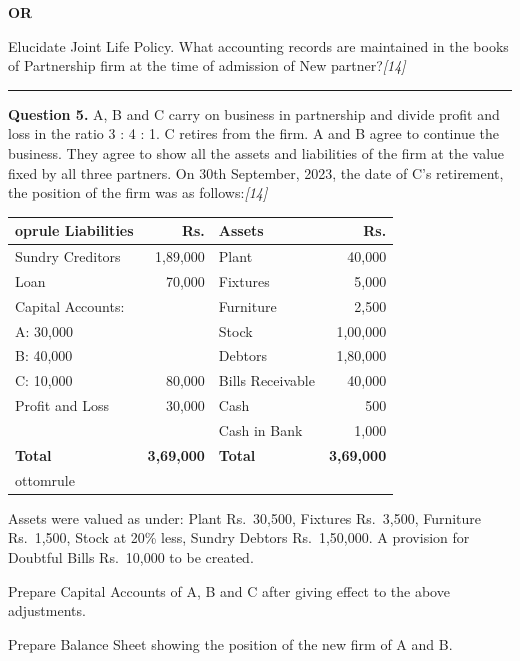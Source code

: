 \documentclass[11pt,a4paper]{article}
\newcommand{\pts}[1]{\hfill   \textit{[#1]}}
\begin{document}
\centerline{   \textbf{OR}}

Elucidate Joint Life Policy. What accounting records are maintained in the books of Partnership firm at the time of admission of New partner?\pts{14}

\medskip\rule{\linewidth}{0.2pt}




\noindent   \textbf{Question 5.}
A, B and C carry on business in partnership and divide profit and loss in the ratio 3 : 4 : 1. C retires from the firm. A and B agree to continue the business. They agree to show all the assets and liabilities of the firm at the value fixed by all three partners. On 30th September, 2023, the date of C's retirement, the position of the firm was as follows:\pts{14}


\begin{center}\small
  
\begin{tabular}{lr|lr}
     oprule
   \textbf{Liabilities} &   \textbf{Rs.} &   \textbf{Assets} &   \textbf{Rs.} \\
    \midrule
    Sundry Creditors & 1,89,000 & Plant & 40,000 \\
    Loan & 70,000 & Fixtures & 5,000 \\
    Capital Accounts: & & Furniture & 2,500 \\
    \quad A: 30,000 & & Stock & 1,00,000 \\
    \quad B: 40,000 & & Debtors & 1,80,000 \\
    \quad C: 10,000 & 80,000 & Bills Receivable & 40,000 \\
    Profit and Loss & 30,000 & Cash & 500 \\
    & & Cash in Bank & 1,000 \\
    \midrule
   \textbf{Total} &   \textbf{3,69,000} &   \textbf{Total} &   \textbf{3,69,000} \\
    ottomrule
  \end{tabular}
\end{center}




\noindent Assets were valued as under: Plant Rs.\ 30,500, Fixtures Rs.\ 3,500, Furniture Rs.\ 1,500, Stock at 20\% less, Sundry Debtors Rs.\ 1,50,000. A provision for Doubtful Bills Rs.\ 10,000 to be created.

\begin{parts}
  \item Prepare Capital Accounts of A, B and C after giving effect to the above adjustments.
  \item Prepare Balance Sheet showing the position of the new firm of A and B.
\end{parts}
\end{document}

